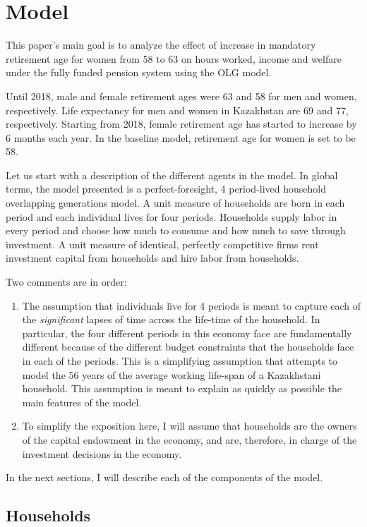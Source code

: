 \documentclass[ProjectUYA]{subfiles}
\begin{document}
\section{Model}
This paper's main goal is to analyze the effect of increase in mandatory retirement age for women from 58 to 63 on hours worked, income and welfare under the fully funded pension system using the OLG model.

Until 2018, male and female retirement ages were 63 and 58 for men and women, respectively. Life expectancy for men and women in Kazakhstan are 69 and 77, respectively. Starting from 2018, female retirement age has started to increase by 6 months each year. In the baseline model, retirement age for women is set to be 58. 

 Let us start with a description of the different agents in the model. In global terms, the model presented is a perfect-foresight, 4 period-lived household overlapping generations model. A unit measure 
 of households are born in each period and each individual lives for four periods. Households supply labor in every period and choose how much to consume and how much to save through investment. A unit measure of identical, perfectly competitive firms rent investment capital from households and hire labor from households. 


 Two comments are in order:
 	\begin{enumerate}
 		\item  The assumption that individuals live for 4 periods is meant to capture each of the \emph{significant} lapses of time across the life-time of the household. In particular, the four different periods in this economy face are fundamentally different because of the different budget constraints that the households face in each of the periods. This is a simplifying assumption that attempts to model the 56 years of the average working life-span of a Kazakhstani household. This assumption is meant to explain as quickly as possible the main features of the model. 
 		\item To simplify the exposition here, I will assume that households are the owners of the capital endowment in the economy, and are, therefore, in charge of the investment decisions in the economy. 
 	\end{enumerate}

 In the next sections, I will describe each of the components of the model.

 \subsection{Households}
\end{document}

